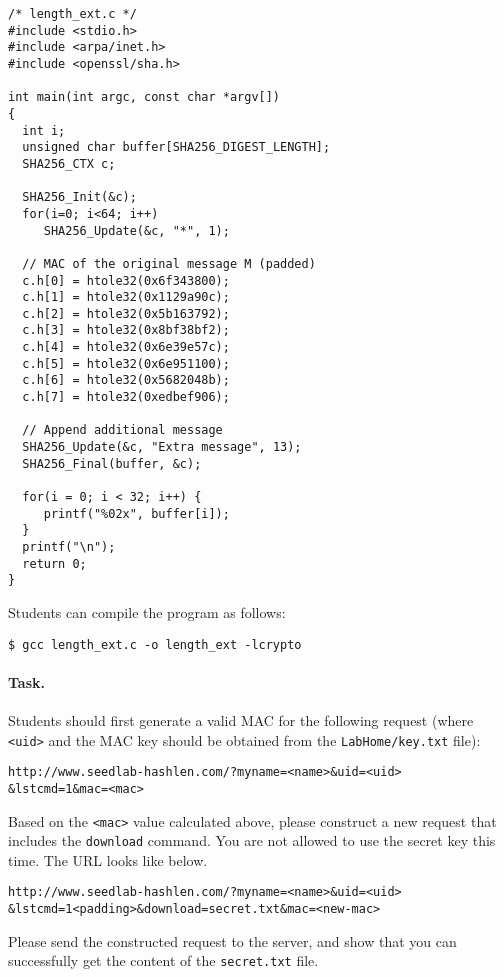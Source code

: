 \begin{lstlisting}[escapechar=|]
/* length_ext.c */
#include <stdio.h>
#include <arpa/inet.h>
#include <openssl/sha.h>

int main(int argc, const char *argv[])
{
  int i;
  unsigned char buffer[SHA256_DIGEST_LENGTH];
  SHA256_CTX c;

  SHA256_Init(&c);
  for(i=0; i<64; i++)
     SHA256_Update(&c, "*", 1);

  // MAC of the original message M (padded)
  c.h[0] = htole32(0x6f343800);
  c.h[1] = htole32(0x1129a90c);
  c.h[2] = htole32(0x5b163792);
  c.h[3] = htole32(0x8bf38bf2);
  c.h[4] = htole32(0x6e39e57c);
  c.h[5] = htole32(0x6e951100);
  c.h[6] = htole32(0x5682048b);
  c.h[7] = htole32(0xedbef906);

  // Append additional message
  SHA256_Update(&c, "Extra message", 13);
  SHA256_Final(buffer, &c);

  for(i = 0; i < 32; i++) {
     printf("%02x", buffer[i]);
  }
  printf("\n");
  return 0;
}
\end{lstlisting}

Students can compile the program as follows:

\begin{lstlisting}
$ gcc length_ext.c -o length_ext -lcrypto
\end{lstlisting}

\paragraph{Task.} Students should first generate a valid MAC for the
following request (where \texttt{<uid>} and the MAC key should be
obtained from the \texttt{LabHome/key.txt} file):

\begin{lstlisting}
http://www.seedlab-hashlen.com/?myname=<name>&uid=<uid>
&lstcmd=1&mac=<mac>
\end{lstlisting}

Based on the \texttt{<mac>} value calculated above, please construct a new request that
includes the \texttt{download} command. You are not allowed to use the secret key this time.
The URL looks like below.

\begin{lstlisting}
http://www.seedlab-hashlen.com/?myname=<name>&uid=<uid>
&lstcmd=1<padding>&download=secret.txt&mac=<new-mac>
\end{lstlisting}

Please send the constructed request to the server, and show that you can
successfully get the content of the \texttt{secret.txt} file.



